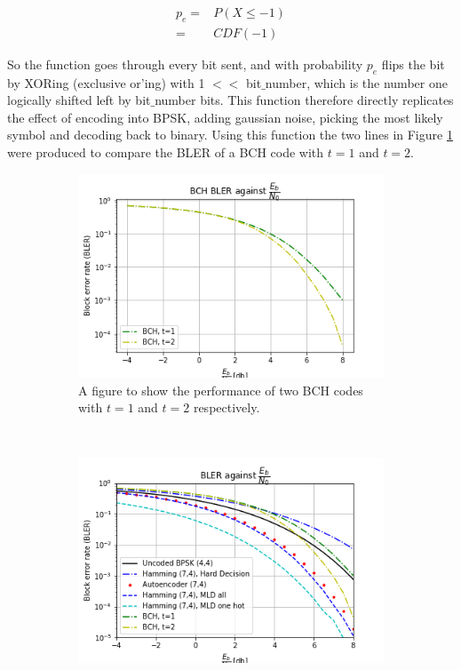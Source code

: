 \documentclass[12pt,onecolumn,letterpaper]{article}
\begin{document}
\begin{align}
   p_e =& P(X \leq -1) \nonumber\\
   =& CDF(-1)
   \label{eq:GaussianBitflip}
\end{align}

So the function goes through every bit sent, and with probability $p_e$ flips the bit by XORing (exclusive or'ing) with 1 $<<$ bit$\_$number, which is the number one logically shifted left by bit$\_$number bits. This function therefore directly replicates the effect of encoding into BPSK, adding gaussian noise, picking the most likely symbol and decoding back to binary. Using this function the two lines in Figure \ref{fig:BchT1VsT2} were produced to compare the BLER of a BCH code with $t=1$ and $t=2$. 

\begin{figure}[t!]
   \centering
  \begin{subfigure}[t]{0.45\textwidth}
       \centering
       \includegraphics[width=\linewidth]{figures/bch_t1_vs_t2.png}
       \caption{A figure to show the performance of two BCH codes with $t=1$ and $t=2$ respectively.}
       \label{fig:BchT1VsT2}
   \end{subfigure}
   ~
   \begin{subfigure}[t]{0.45\textwidth}
       \centering
       \includegraphics[width=\linewidth]{figures/o_shea_3a_bler_vs_eb_bch.png}

\end{subfigure}
\end{figure}
\end{document}
